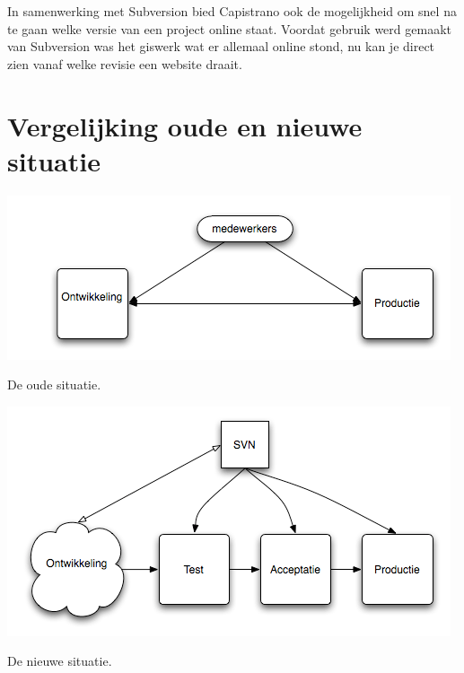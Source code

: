 In samenwerking met Subversion bied Capistrano ook de mogelijkheid om snel na te gaan welke versie van een project online staat. Voordat gebruik werd gemaakt van Subversion was het giswerk wat er allemaal online stond, nu kan je direct zien vanaf welke revisie een website draait.

\section{Vergelijking oude en nieuwe situatie}

\includegraphics[scale=0.75]{situatie_oud.png}

De oude situatie.

\includegraphics[scale=0.75]{situatie_nieuw.png}

De nieuwe situatie.